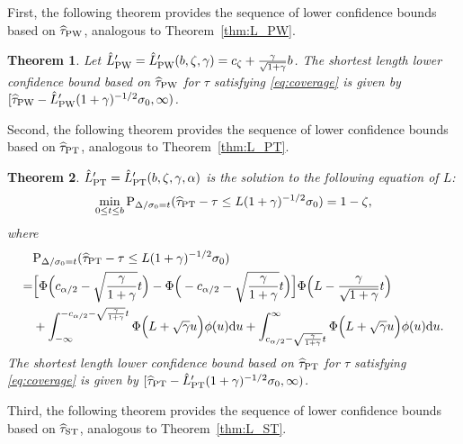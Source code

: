 \documentclass[11pt]{article}
\def\P{{\mathrm P}}
\def\d{{\mathrm d}}
\newcommand{\htau}{\widehat\tau}
\numberwithin{equation}{section}
\newtheorem{theorem}{Theorem}[section]
\theoremstyle{definition}
\begin{document}
First, the following theorem provides the sequence of lower confidence bounds based on $\htau_{\rm PW}$, analogous to Theorem~\ref{thm:L_PW}.

\begin{theorem}\label{thm:oneside_PW}
  Let $\hat{L}_{\rm PW}' = \hat{L}_{\rm PW}'(b, \zeta, \gamma) = c_\zeta + \frac{\gamma}{\sqrt{1+\gamma}} b$. The shortest length lower confidence bound based on $\htau_{\rm PW}$ for $\tau$ satisfying \eqref{eq:coverage} is given by $[\htau_{\rm PW} - \hat{L}_{\rm PW}' (1+\gamma)^{-1/2} \sigma_0, \infty)$.
\end{theorem}

Second, the following theorem provides the sequence of lower confidence bounds based on $\htau_{\rm PT}$, analogous to Theorem~\ref{thm:L_PT}.
\begin{theorem}\label{thm:oneside_PT}
    $\hat{L}_{\rm PT}' = \hat{L}_{\rm PT}'(b, \zeta, \gamma, \alpha)$ is the solution to the following equation of $L$:
    \begin{align*}
      \min_{0 \le t \le b}\P_{\Delta/\sigma_0 = t}(\htau_{\rm PT} - \tau \le L (1+\gamma)^{-1/2} \sigma_0) = 1-\zeta,
    \end{align*}
    where
    \begin{align*}
      &\P_{\Delta/\sigma_0 = t}(\htau_{\rm PT} - \tau \le L (1+\gamma)^{-1/2} \sigma_0) \\
      =& \Big[\Phi\Big(c_{\alpha/2} - \sqrt{\frac{\gamma}{1+\gamma}}t \Big) - \Phi\Big(-c_{\alpha/2} - \sqrt{\frac{\gamma}{1+\gamma}}t \Big)\Big]\Phi\Big(L - \frac{\gamma}{\sqrt{1+\gamma}}t \Big)\\
      &+ \int_{-\infty}^{-c_{\alpha/2} - \sqrt{\frac{\gamma}{1+\gamma}}t} \Phi\Big(L + \sqrt{\gamma} u \Big)\phi(u) \d u + \int_{c_{\alpha/2} - \sqrt{\frac{\gamma}{1+\gamma}}t}^\infty \Phi\Big(L + \sqrt{\gamma} u\Big)\phi(u) \d u.
    \end{align*}
  The shortest length lower confidence bound based on $\htau_{\rm PT}$ for $\tau$ satisfying \eqref{eq:coverage} is given by $[\htau_{\rm PT} - \hat{L}_{\rm PT}' (1+\gamma)^{-1/2} \sigma_0, \infty)$.
\end{theorem}

Third, the following theorem provides the sequence of lower confidence bounds based on $\htau_{\rm ST}$, analogous to Theorem~\ref{thm:L_ST}.
\end{document}
